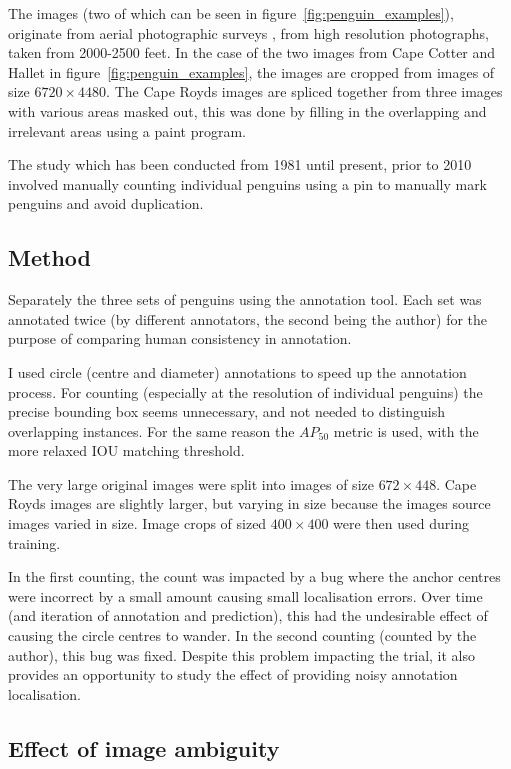 The images (two of which can be seen in figure~\ref{fig:penguin_examples}), originate from aerial photographic surveys \cite{Lyver2014}, from high resolution photographs, taken from 2000-2500 feet. In the case of the two images from Cape Cotter and Hallet in figure~\ref{fig:penguin_examples}, the images are cropped from images of size $ 6720\times4480 $. The Cape Royds images are spliced together from three images with various areas masked out, this was done by filling in the overlapping and irrelevant areas using a paint program.

The study which has been conducted from 1981 until present, prior to 2010 involved manually counting individual penguins using a pin to manually mark penguins and avoid duplication. 


\subsection {Method}

Separately the three sets of penguins using the annotation tool. Each set was annotated twice (by different annotators, the second being the author) for the purpose  of comparing human consistency in annotation.

I used circle (centre and diameter) annotations to speed up the annotation process. For counting (especially at the resolution of individual penguins) the precise bounding box seems unnecessary, and not needed to distinguish overlapping instances. For the same reason the $AP_{50}$ metric is used, with the more relaxed \gls{IOU} matching threshold.

The very large original images were split into images of size $ 672\times448 $. Cape Royds images are slightly larger, but varying in size because the images source images varied in size. Image crops of sized $ 400\times400 $ were then used during training.

In the first counting, the count was impacted by a bug where the anchor centres were incorrect by a small amount causing small localisation errors. Over time (and iteration of annotation and prediction), this had the undesirable effect of causing the circle centres to wander. In the second counting (counted by the author), this bug was fixed. Despite this problem impacting the trial, it also provides an opportunity to study the effect of providing noisy annotation localisation.

\subsection {Effect of image ambiguity}

